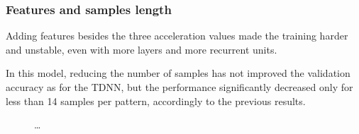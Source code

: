 \subsubsection{Features and samples length}
Adding features besides the three acceleration values made the training harder and unstable, even with more layers and more recurrent units. 

In this model, reducing the number of samples has not improved the validation accuracy as for the TDNN, but the performance significantly decreased only for less than 14 samples per pattern, accordingly to the previous results.

\begin{center}
	\begin{figure}[ht]
		\caption{\dots}
	\end{figure}
\end{center}
